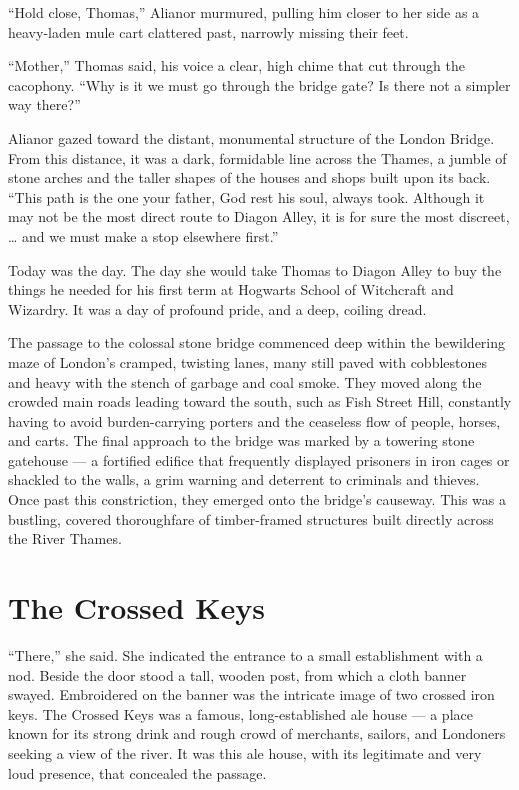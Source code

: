 \enquote{Hold close, Thomas,} Alianor murmured, pulling him closer to her side as a heavy-laden mule cart clattered past, narrowly missing their feet.

\enquote{Mother,} Thomas said, his voice a clear, high chime that cut through the cacophony. \enquote{Why is it we must go through the bridge gate? Is there not a simpler way there?}

Alianor gazed toward the distant, monumental structure of the London Bridge. From this distance, it was a dark, formidable line across the Thames, a jumble of stone arches and the taller shapes of the houses and shops built upon its back. \enquote{This path is the one your father, God rest his soul, always took. Although it may not be the most direct route to Diagon Alley, it is for sure the most discreet, \ldots{} and we must make a stop elsewhere first.}

Today was the day. The day she would take Thomas to Diagon Alley to buy the things he needed for his first term at Hogwarts School of Witchcraft and Wizardry. It was a day of profound pride, and a deep, coiling dread.

The passage to the colossal stone bridge commenced deep within the bewildering maze of London's cramped, twisting lanes, many still paved with cobblestones and heavy with the stench of garbage and coal smoke. They moved along the crowded main roads leading toward the south, such as Fish Street Hill, constantly having to avoid burden-carrying porters and the ceaseless flow of people, horses, and carts. The final approach to the bridge was marked by a towering stone gatehouse --- a fortified edifice that frequently displayed prisoners in iron cages or shackled to the walls, a grim warning and deterrent to criminals and thieves. Once past this constriction, they emerged onto the bridge's causeway. This was a bustling, covered thoroughfare of timber-framed structures built directly across the River Thames.

\section*{The Crossed Keys}

\enquote{There,} she said. She indicated the entrance to a small establishment with a nod. Beside the door stood a tall, wooden post, from which a cloth banner swayed. Embroidered on the banner was the intricate image of two crossed iron keys. The Crossed Keys was a famous, long-established ale house --- a place known for its strong drink and rough crowd of merchants, sailors, and Londoners seeking a view of the river. It was this ale house, with its legitimate and very loud presence, that concealed the passage.

